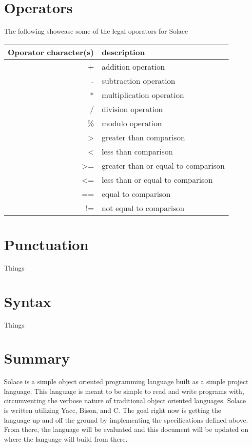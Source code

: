 \documentclass{article}
\begin{document}
\section{Operators}
The following showcase some of the legal oporators for Solace

\begin{tabular}{r|l}
Oporator character(s) & description \\
\hline
\hline
+ & addition operation \\
- & subtraction operation \\
* & multiplication operation \\
/ & division operation \\
\% & modulo operation \\
> & greater than comparison \\
< & less than comparison \\
>= & greater than or equal to comparison \\
<= & less than or equal to comparison \\
== & equal to comparison \\
!= & not equal to comparison \\
\hline
\end{tabular}

\section{Punctuation}
Things


\section{Syntax}
Things


\section{Summary}
Solace is a simple object oriented programming language built as a simple project language.
This language is meant to be simple to read and write programs with, circumventing the verbose
nature of traditional object oriented languages. Solace is written utilizing Yacc, Bison, and C.
The goal right now is getting the language up and off the ground by implementing the specifications
defined above. From there, the language will be evaluated and this document will be updated on
where the language will build from there.
\end{document}
